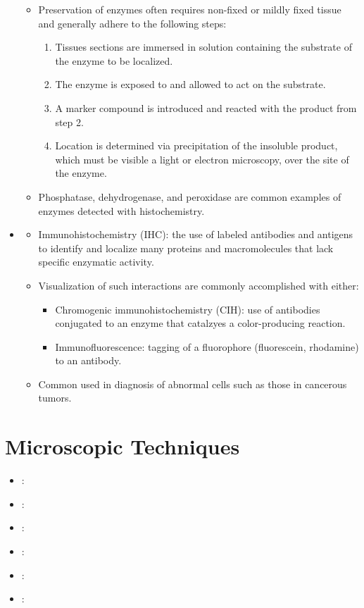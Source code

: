 \begin{itemize}
\begin{itemize}
      \item Preservation of enzymes often requires non-fixed or mildly fixed tissue and generally adhere to the following steps:
        \begin{enumerate}
          \item Tissues sections are immersed in solution containing the substrate of the enzyme to be localized.
          \item The enzyme is exposed to and allowed to act on the substrate.
          \item A marker compound is introduced and reacted with the product from step 2.
          \item Location is determined via precipitation of the insoluble product, which must be visible a light or electron microscopy, over the site of the enzyme.
        \end{enumerate}
      \item Phosphatase, dehydrogenase, and peroxidase are common examples of enzymes detected with histochemistry.
    \end{itemize}
  \item {}
    \begin{itemize}
      \item Immunohistochemistry (IHC): the use of labeled antibodies and antigens to identify and localize many proteins and macromolecules that lack specific enzymatic activity. 
      \item Visualization of such interactions are commonly  accomplished with either:
        \begin{itemize}
          \item Chromogenic immunohistochemistry (CIH): use of antibodies conjugated to an enzyme that catalzyes a color-producing reaction.
          \item Immunofluorescence: tagging of a fluorophore (fluorescein, rhodamine) to an antibody. 
        \end{itemize}
      \item Common used in diagnosis of abnormal cells such as those in cancerous tumors. 
    \end{itemize}
\end{itemize}

\section{Microscopic Techniques}
\begin{itemize}
  \item {}:
  \item {}:
  \item {}:
  \item {}:
  \item {}:
  \item {}:
\end{itemize}

